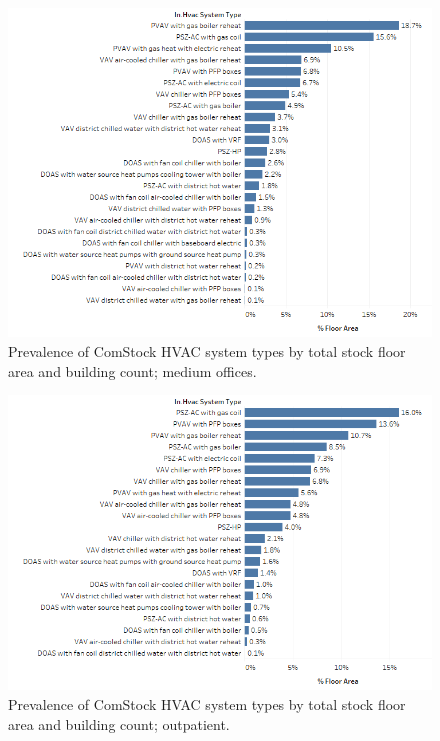 \begin{figure}
    \centering \includegraphics[width=1.0\textwidth]{figures/HVAC_SYS_Type_PREV_MedOffice.png}
    \caption[HVAC system type prevalence in medium offices]{Prevalence of ComStock HVAC system types by total stock floor area and building count; medium offices.}
    \label{fig:hvac_sys_type_prevalence_medoffice}
\end{figure}

\begin{figure}
    \centering \includegraphics[width=1.0\textwidth]{figures/HVAC_SYS_Type_PREV_Outpatient.png}
    \caption[HVAC system type prevalence in outpatient]{Prevalence of ComStock HVAC system types by total stock floor area and building count; outpatient.}
    \label{fig:hvac_sys_type_prevalence_outpatient}
\end{figure}

